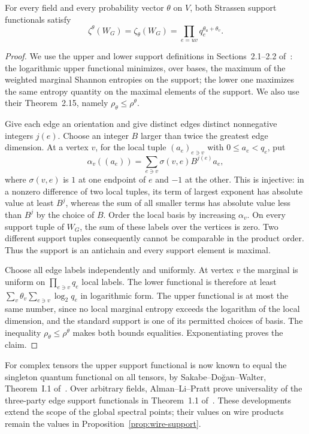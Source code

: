 \begin{proposition}
\label{prop:wire-support}
For every field and every probability vector $\theta$ on $V$, both Strassen support functionals satisfy
\[
 \zeta^\theta(W_G)=\zeta_\theta(W_G)
     =\prod_{e=uv}q_e^{\theta_u+\theta_v}.
\]
\end{proposition}
\begin{proof}
We use the upper and lower support definitions in Sections~2.1--2.2 of~\cite{cvz-universal}: the logarithmic upper functional minimizes, over bases, the maximum of the weighted marginal Shannon entropies on the support; the lower one maximizes the same entropy quantity on the maximal elements of the support.  We also use their Theorem~2.15, namely $\rho_\theta\leq\rho^\theta$.

Give each edge an orientation and give distinct edges distinct nonnegative integers $j(e)$.  Choose an integer $B$ larger than twice the greatest edge dimension.  At a vertex $v$, for the local tuple $(a_e)_{e\ni v}$ with $0\leq a_e<q_e$, put
\[
 \alpha_v((a_e))=\sum_{e\ni v}\sigma(v,e)B^{j(e)}a_e,
\]
where $\sigma(v,e)$ is $1$ at one endpoint of $e$ and $-1$ at the other.  This is injective: in a nonzero difference of two local tuples, its term of largest exponent has absolute value at least $B^j$, whereas the sum of all smaller terms has absolute value less than $B^j$ by the choice of $B$.
Order the local basis by increasing $\alpha_v$.  On every support tuple of $W_G$, the sum of these labels over the vertices is zero.  Two different support tuples consequently cannot be comparable in the product order.  Thus the support is an antichain and every support element is maximal.

Choose all edge labels independently and uniformly.  At vertex $v$ the marginal is uniform on $\prod_{e\ni v}q_e$ local labels.  The lower functional is therefore at least
$\sum_v\theta_v\sum_{e\ni v}\log_2 q_e$ in logarithmic form.  The upper functional is at most the same number, since no local marginal entropy exceeds the logarithm of the local dimension, and the standard support is one of its permitted choices of basis.  The inequality $\rho_\theta\leq\rho^\theta$ makes both bounds equalities.  Exponentiating proves the claim.
\end{proof}

For complex tensors the upper support functional is now known to equal the singleton quantum functional on all tensors, by Sakabe--Do\u gan--Walter, Theorem~I.1 of~\cite{sdw-support}.  Over arbitrary fields, Alman--Li--Pratt prove universality of the three-party edge support functionals in Theorem~1.1 of~\cite{alp-edge}.  These developments extend the scope of the global spectral points; their values on wire products remain the values in Proposition~\ref{prop:wire-support}.

